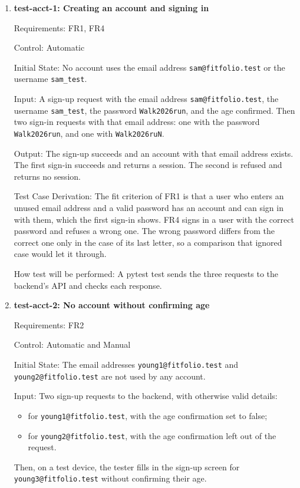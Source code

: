 \documentclass[12pt, titlepage]{article}
\begin{document}
\begin{enumerate}

\item{\textbf{test-acct-1: Creating an account and signing in}\\}

Requirements: FR1, FR4

Control: Automatic

Initial State: No account uses the email address \texttt{sam@fitfolio.test}
or the username \texttt{sam\_test}.

Input: A sign-up request with the email address \texttt{sam@fitfolio.test},
the username \texttt{sam\_test}, the password \texttt{Walk2026run}, and the age
confirmed. Then two sign-in requests with that email address: one with the
password \texttt{Walk2026run}, and one with \texttt{Walk2026ruN}.

Output: The sign-up succeeds and an account with that email address exists.
The first sign-in succeeds and returns a session. The second is refused and
returns no session.

Test Case Derivation: The fit criterion of FR1 is that a user who enters an
unused email address and a valid password has an account and can sign in with
them, which the first sign-in shows. FR4 signs in a user with the correct
password and refuses a wrong one. The wrong password differs from the correct
one only in the case of its last letter, so a comparison that ignored case
would let it through.

How test will be performed: A pytest test sends the three requests to the
backend's API and checks each response.

\item{\textbf{test-acct-2: No account without confirming age}\\}

Requirements: FR2

Control: Automatic and Manual

Initial State: The email addresses \texttt{young1@fitfolio.test} and
\texttt{young2@fitfolio.test} are not used by any account.

Input: Two sign-up requests to the backend, with otherwise valid details:
\begin{itemize}
  \item for \texttt{young1@fitfolio.test}, with the age confirmation set to
    false;
  \item for \texttt{young2@fitfolio.test}, with the age confirmation left out
    of the request.
\end{itemize}
Then, on a test device, the tester fills in the sign-up screen for
\texttt{young3@fitfolio.test} without confirming their age.


\end{enumerate}
\end{document}
